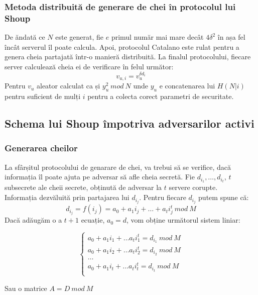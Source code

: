 \documentclass[12]{report}
\begin{document}
\subsubsection{Metoda distribuită de generare de chei în protocolul lui Shoup}
De ăndată ce $N$ este generat, fie $e$ primul număr mai mare decât $4 \delta^{2}$  în așa fel încât serverul îl poate calcula. Apoi, protocolul Catalano \cite{catalano} este rulat pentru a genera cheia partajată într-o manieră distribuită. La finalul protocolului, fiecare server calculează cheia ei de verificare în felul următor:
$$ v_{u,i} = v_{u}^{\delta d_i}$$
Pentru $v_u$ aleator calculat ca și $y_{u}^{2} \ mod \ N$ unde $y_u$ e concatenarea lui $H(N|i)$ pentru suficient de mulți $i$ pentru a colecta corect parametri de securitate.

\subsection{Schema lui Shoup împotriva adversarilor activi}
\subsubsection{Generarea cheilor}
La sfârșitul protocolului de genarare de chei, va trebui să se verifice, dacă informația îl poate ajuta pe adversar să afle cheia secretă. Fie $d_{i_1}, \dots ,d_{i_t}$, $t$ subsecrete ale cheii secrete, obținută de adversar la $t$ servere corupte. \\
Informația dezvăluită prin partajarea lui $d_{i_j}$. Pentru fiecare $d_{i_j}$ putem spune că: 
$$d_{i_j} = f(i_j) = a_0 + a_1i_j +  \dots  + a_t i_{j}^{t} \ mod \ M       $$
Dacă adăugăm o a $t+1$ ecuație, $a_0=d$, vom obține următorul sistem liniar:



\[
\left\{ 
\begin{array}{c}
a_0 + a_1 i_1 +  \dots  a_t i_{1}^{t}  = d_{i_1} \ mod \ M \\ 
a_0 + a_1 i_2 +  \dots  a_t i_{2}^{t}  = d_{i_2} \ mod \ M \\ 
 \dots  \\
a_0 + a_1 i_t +  \dots  a_t i_{t}^{t}  = d_{i_t} \ mod \ M \\
\end{array}
\right. 
\]

Sau o matrice $A = D \ mod \ M$
\end{document}
